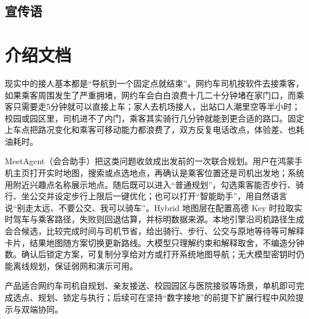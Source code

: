 \documentclass[UTF8,a4paper,zihao=-4]{ctexart}
\begin{document}
\subsection{宣传语}

\begin{center}
\end{center}

\section{介绍文档}

{\songti
现实中的接人基本都是“导航到一个固定点就结束”。网约车司机按软件去接乘客，如果乘客周围发生了严重拥堵，网约车会白白浪费十几二十分钟堵在家门口，而乘客只需要走5分钟就可以直接上车；家人去机场接人，出站口人潮里空等半小时；校园或园区里，司机进不了内门，乘客其实骑行几分钟就能到更合适的路口。固定上车点把路况变化和乘客可移动能力都浪费了，双方反复电话改点，体验差、也耗油耗时。

MeetAgent（会合助手）把这类问题收敛成出发前的一次联合规划。用户在鸿蒙手机主页打开实时地图，搜索或点选地点，再确认是乘客位置还是司机出发地；系统用附近兴趣点名称展示地点。随后既可以进入“普通规划”，勾选乘客能否步行、骑行、坐公交并设定步行上限后一键优化；也可以打开“智能助手”，用自然语言说“别走太远、不要公交、我可以骑车”。Hybrid 地图层在配置高德 Key 时拉取实时驾车与乘客路径，失败则回退估算，并标明数据来源。本地引擎沿司机路径生成会合候选，比较完成时间与司机节省，给出骑行、步行、公交与原地等待等可解释卡片，结果地图随方案切换更新路线。大模型只理解约束和解释取舍，不编造分钟数。确认后锁定方案，可复制分享给对方或打开系统地图导航；无大模型密钥时仍能离线规划，保证弱网和演示可用。

产品适合网约车司机自规划、亲友接送、校园园区与医院接驳等场景，单机即可完成选点、规划、锁定与执行；后续可在坚持“数字接地”的前提下扩展行程中风险提示与双端协同。
}

\vspace{0.4em}
\end{document}

